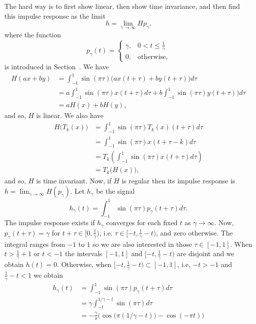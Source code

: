 \begin{excersizelist}
\begin{solution}
The hard way is to first show linear, then show time invariance, and then find this impulse response as the limit 
\[
h = \lim_{\gamma \rightarrow \infty} H p_\gamma.
\]
where the function 
\[
p_\gamma(t) = \begin{cases}
\gamma, & 0 < t \leq \frac{1}{\gamma} \\
0, & \text{otherwise},
\end{cases}
\]
is introduced in Section~.  We have
\begin{align*}
H(ax+by) &= \int_{-1}^{1} \sin(\pi\tau) \big( ax(t + \tau) + by(t + \tau) \big) d\tau \\
&= a \int_{-1}^{1} \sin(\pi\tau) x(t + \tau) d\tau + b\int_{-1}^{1} \sin(\pi\tau)  y(t + \tau) \big) d\tau \\
&= aH(x) + bH(y),
\end{align*}
and so, $H$ is linear.  We also have
\begin{align*}
H\big(T_k(x)\big) &= \int_{-1}^{1} \sin(\pi\tau) T_k(x)(t + \tau) d\tau \\
&= \int_{-1}^{1} \sin(\pi\tau) x(t + \tau - k) d\tau \\
&= T_k \left( \int_{-1}^{1} \sin(\pi\tau) x(t + \tau) d\tau   \right) \\
&= T_k\big(H(x)\big),
\end{align*}
and so, $H$ is time invariant.  Now, if $H$ is regular then its impulse response is $h = \lim_{\gamma \rightarrow \infty} H(p_\gamma)$.  Let $h_\gamma$ be the signal
\[
h_\gamma(t) = \int_{-1}^{1} \sin(\pi\tau) p_\gamma(t + \tau) d\tau.
\]
The impulse response exists if $h_\gamma$ converges for each fixed $t$ as $\gamma \to \infty$.  %
Now, $p_\gamma(t+\tau) = \gamma$ for $t + \tau \in [0, \tfrac{1}{\gamma})$, i.e. $\tau \in [-t, \tfrac{1}{\gamma}-t)$, and zero otherwise.  The integral ranges from $-1$ to $1$ so we are also interested in those $\tau \in [-1,1]$.  When $t > \tfrac{1}{\gamma} +1$ or $t < -1$ the intervals $[-1,1]$ and  $[-t, \tfrac{1}{\gamma}-t)$ are disjoint and we obtain $h(t) = 0$.  Otherwise, when $[-t, \tfrac{1}{\gamma} - t) \subset [-1,1]$, i.e, $-t > -1$ and $\tfrac{1}{\gamma} - t < 1$ we obtain
\begin{align*}
h_\gamma(t) &= \int_{-1}^{1} \sin(\pi\tau) p_\gamma(t + \tau) d\tau \\
&= \gamma \int_{-t}^{1/\gamma - t} \sin(\pi\tau) d\tau \\
&= - \frac{\gamma}{\pi} \big( \cos\big(\pi(1/\gamma - t)\big) - \cos(-\pi t) \big) \\

\end{align*}
\end{solution}
\end{excersizelist}
